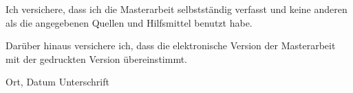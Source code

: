Ich versichere, dass ich die Masterarbeit selbstständig verfasst und keine anderen als die angegebenen Quellen und Hilfsmittel benutzt habe.

Darüber hinaus versichere ich, dass die elektronische Version der Masterarbeit mit der gedruckten Version übereinstimmt.


\vspace{4cm}

\hspace{2cm} Ort, Datum \hfill Unterschrift \hspace{2cm}